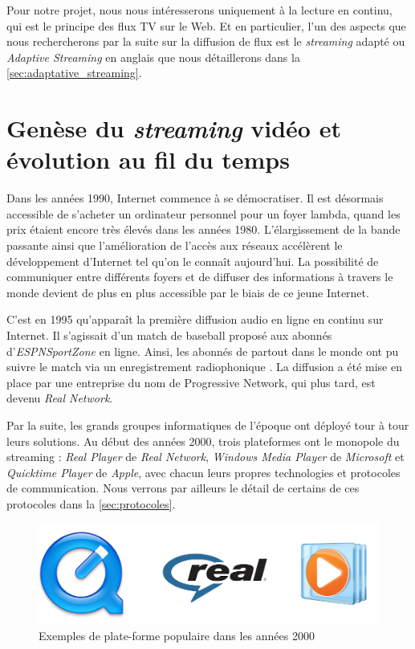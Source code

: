 \documentclass{polytech/polytech}
\begin{document}
Pour notre projet, nous nous intéresserons uniquement à la lecture en continu, qui est le principe des flux TV sur le Web. Et en particulier, l’un des aspects que nous rechercherons par la suite sur la diffusion de flux est le \textit{streaming} adapté ou \textit{Adaptive Streaming} en anglais que nous détaillerons dans la \autoref{sec:adaptative_streaming}.



\section{Genèse du \textit{streaming} vidéo et évolution au fil du temps}

Dans les années 1990, Internet commence à se démocratiser. Il est désormais accessible de s’acheter un ordinateur personnel pour un foyer lambda, quand les prix étaient encore très élevés dans les années 1980. L’élargissement de la bande passante ainsi que l’amélioration de l’accès aux réseaux accélèrent le développement d’Internet tel qu’on le connaît aujourd'hui. La possibilité de communiquer entre différents foyers et de diffuser des informations à travers le monde devient de plus en plus accessible par le biais de ce jeune Internet.

C’est en 1995 qu’apparaît la première diffusion audio en ligne en continu sur Internet. Il s’agissait d’un match de baseball proposé aux abonnés d’\textit{ESPNSportZone} en ligne. Ainsi, les abonnés de partout dans le monde ont pu suivre le match via un enregistrement radiophonique \cite{zambelli_history_2013}. La diffusion a été mise en place par une entreprise du nom de Progressive Network, qui plus tard, est devenu \textit{Real Network}.

Par la suite, les grands groupes informatiques de l’époque ont déployé tour à tour leurs solutions. Au début des années 2000, trois plateformes ont le monopole du streaming : \textit{Real Player} de \textit{Real Network}, \textit{Windows Media Player} de \textit{Microsoft} et \textit{Quicktime Player} de \textit{Apple}, avec chacun leurs propres technologies et protocoles de communication. Nous verrons par ailleurs le détail de certains de ces protocoles dans la \autoref{sec:protocoles}.

\begin{figure}
	\includegraphics[scale=0.70]{images/logos_platform.png}
	\caption{Exemples de plate-forme populaire dans les années 2000}
	\label{fig:logoPlatform}
\end{figure}
\end{document}

